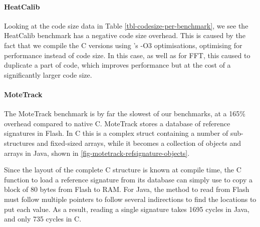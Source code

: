 \paragraph{HeatCalib}
Looking at the code size data in Table \ref{tbl-codesize-per-benchmark}, we see the HeatCalib benchmark has a negative code size overhead. This is caused by the fact that we compile the C versions using 's -O3 optimisations, optimising for performance instead of code size. In this case, as well as for FFT, this caused  to duplicate a part of code, which improves performance but at the cost of a significantly larger code size.

\paragraph{MoteTrack}
The MoteTrack benchmark is by far the slowest of our benchmarks, at a 165\% overhead compared to native C. MoteTrack stores a database of reference signatures in Flash. In C this is a complex struct containing a number of sub-structures and fixed-sized arrays, while it becomes a collection of objects and arrays in Java, shown in \ref{fig-motetrack-refsignature-objects}.

Since the layout of the complete C structure is known at compile time, the C function to load a reference signature from its database can simply use  to copy a block of 80 bytes from Flash to RAM. For Java, the method to read from Flash must follow multiple pointers to follow several indirections to find the locations to put each value. As a result, reading a single signature takes 1695 cycles in Java, and only 735 cycles in C.



